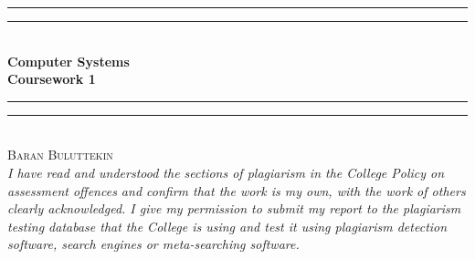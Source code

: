 \documentclass[12pt]{article}
\begin{document}
    \begin{titlepage}
        \begin{center}
            \vspace*{.06\textheight}{\scshape\LARGE Birkbeck, University of London\par}\vspace{1.5cm} %
            \rule[0.5ex]{\linewidth}{2pt}\vspace*{-\baselineskip}\vspace*{3.2pt}
            \rule[0.5ex]{\linewidth}{1pt}\\[\baselineskip]
            \huge{\bfseries Computer Systems\\Coursework 1}\\[4mm]
            \rule[0.5ex]{\linewidth}{1pt}\vspace*{-\baselineskip}\vspace{3.2pt}
            \rule[0.5ex]{\linewidth}{2pt}\\
            [2.5cm]
        
            \textsc{\Large Baran Buluttekin}\\
            [2.5cm]
            \large \textit{ I have read and understood the sections of plagiarism in the College Policy on assessment offences and confirm that the work is my own, with the work of others clearly acknowledged. I give my permission to submit my report to the plagiarism testing database that the College is using and test it using plagiarism detection software, search engines or meta-searching software.}


        \end{center}
    \end{titlepage}
\end{document}
